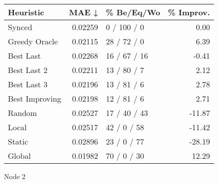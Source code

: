 \begin{tabular}{lrlr}
\toprule
\textbf{Heuristic} & \textbf{MAE ↓} & \textbf{\% Be/Eq/Wo} & \textbf{\% Improv.} \\
\midrule
            Synced &        0.02259 &          0 / 100 / 0 &                0.00 \\
     Greedy Oracle &        0.02115 &          28 / 72 / 0 &                6.39 \\
         Best Last &        0.02268 &         16 / 67 / 16 &               -0.41 \\
       Best Last 2 &        0.02211 &          13 / 80 / 7 &                2.12 \\
       Best Last 3 &        0.02196 &          13 / 81 / 6 &                2.78 \\
    Best Improving &        0.02198 &          12 / 81 / 6 &                2.71 \\
            Random &        0.02527 &         17 / 40 / 43 &              -11.87 \\
             Local &        0.02517 &          42 / 0 / 58 &              -11.42 \\
            Static &        0.02896 &          23 / 0 / 77 &              -28.19 \\
            Global &        0.01982 &          70 / 0 / 30 &               12.29 \\
\bottomrule
\end{tabular}
\caption{Node 2}
\label{tab:non_lr05_le1_bs2_2}
